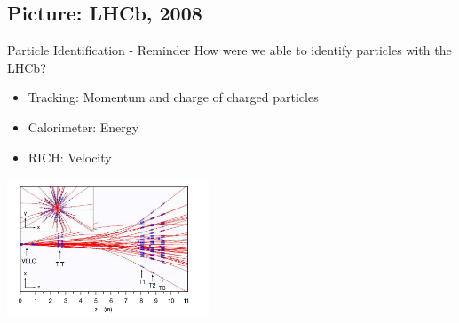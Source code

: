 \subsection{Picture: LHCb, 2008}
\begin{frame}{Particle Identification - Reminder}
How were we able to identify particles with the LHCb?
\vspace{0.5cm}
\begin{itemize}  
    \item Tracking: Momentum and charge of charged particles%
    \item Calorimeter: Energy%
    \item RICH: Velocity%
\end{itemize}%
\vspace{0.5cm}
\begin{center}
    \includegraphics[width = 0.45\textwidth]{Figures Lecture on Datanalysis/2D-Eventdisplay.png}
\end{center}  
\end{frame}

